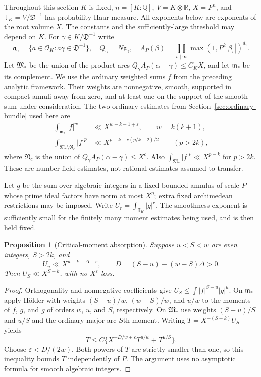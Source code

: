 \documentclass[11pt,reqno]{amsart}
\numberwithin{equation}{section}
\newtheorem{proposition}[theorem]{Proposition}
\theoremstyle{definition}
\begin{document}
Throughout this section $K$ is fixed, $n=[K:\mathbb Q]$, $V=K\otimes\mathbb R$,
$X=P^n$, and $\mathbb T_K=V/\mathfrak D^{-1}$ has probability Haar measure.
All exponents below are exponents of the root volume $X$.
The constants and the sufficiently-large threshold may depend on $K$.
For $\gamma\in K/\mathfrak D^{-1}$ write
\[
 \mathfrak a_\gamma=\{a\in\mathcal O_K:a\gamma\in\mathfrak D^{-1}\},
 \quad Q_\gamma=N\mathfrak a_\gamma,
 \quad A_P(\beta)=\prod_{v\mid\infty}\max(1,P^k|\beta_v|)^{d_v}.
\]
Let $\mathfrak M_*$ be the union of the product arcs
$Q_\gamma A_P(\alpha-\gamma)\le C_KX$, and let $\mathfrak m_*$ be its complement.
We use the ordinary weighted sums $f$ from the preceding analytic framework.
Their weights are nonnegative, smooth, supported in compact annuli away from zero,
and at least one on the support of the smooth sum under consideration.
The two ordinary estimates from Section~\ref{sec:ordinary-bundle} used here are
\begin{align}
 \int_{\mathfrak m_*}|f|^{w}&\ll X^{w-k-1+\varepsilon},\qquad w=k(k+1),
 \label{eq:ordinary-critical-here}\\
 \int_{\mathfrak M_*\setminus\mathfrak N_c}|f|^p
 &\ll X^{p-k-c(p/k-2)/2}\qquad(p>2k),
 \label{eq:ordinary-pruning-here}
\end{align}
where $\mathfrak N_c$ is the union of $Q_\gamma A_P(\alpha-\gamma)\le X^c$.
Also $\int_{\mathfrak M_*}|f|^p\ll X^{p-k}$ for $p>2k$.
These are number-field estimates, not rational estimates assumed to transfer.

Let $g$ be the sum over algebraic integers in a fixed bounded annulus of scale $P$
whose prime ideal factors have norm at most $X^\eta$; extra fixed archimedean
restrictions may be imposed.  Write $U_r=\int_{\mathbb T_K}|g|^r$.
The smoothness exponent is sufficiently small for the finitely many moment estimates
being used, and is then held fixed.

\begin{proposition}[Critical-moment absorption]
\label{prop:bootstrap-here}
Suppose $u<S<w$ are even integers, $S>2k$, and
\[
 U_u\ll X^{u-k+\Delta+\varepsilon},
 \qquad D=(S-u)-(w-S)\Delta>0.
\]
Then $U_S\ll X^{S-k}$, with no $X^\varepsilon$ loss.
\end{proposition}
\begin{proof}
Orthogonality and nonnegative coefficients give
$U_S\le\int |f|^{S-u}|g|^u$.
On $\mathfrak m_*$ apply H\"older with weights
$(S-u)/w$, $(w-S)/w$, and $u/w$ to the moments of $f$, $g$, and $g$
of orders $w$, $u$, and $S$, respectively.
On $\mathfrak M_*$ use weights $(S-u)/S$ and $u/S$ and the ordinary
major-arc $S$th moment.
Writing $T=X^{-(S-k)}U_S$ yields
\[
 T\le C\{X^{-D/w+\varepsilon}T^{u/w}+T^{u/S}\}.
\]
Choose $\varepsilon<D/(2w)$.  Both powers of $T$ are strictly smaller than one,
so this inequality bounds $T$ independently of $P$.
The argument uses no asymptotic formula for smooth algebraic integers.
\end{proof}
\end{document}
